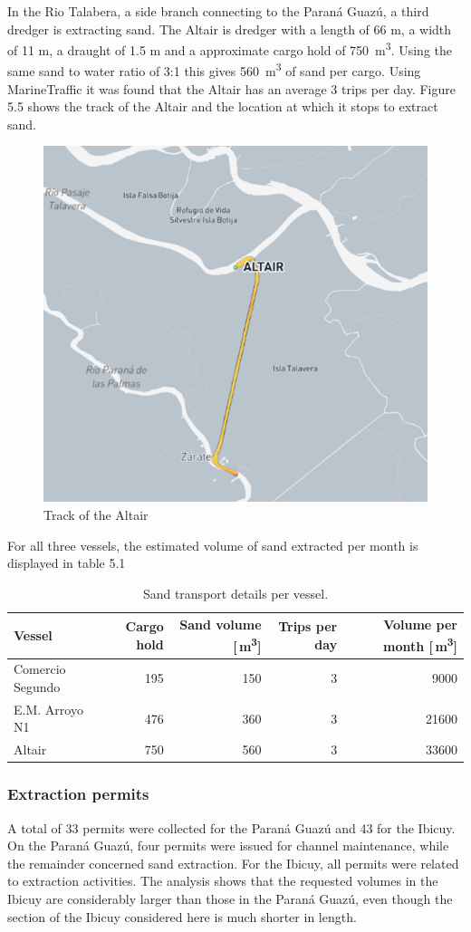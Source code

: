 In the Rio Talabera, a side branch connecting to the Paraná Guazú, a third dredger is extracting sand. The Altair is dredger with a length of 66 m, a width of 11 m, a draught of 1.5 m and a approximate cargo hold of 750 \,m\textsuperscript{3}. Using the same sand to water ratio of 3:1 this gives 560 \,m\textsuperscript{3} of sand per cargo. Using MarineTraffic it was found that the Altair has an average 3 trips per day. Figure 5.5 shows the track of the Altair and the location at which it stops to extract sand. 

\begin{figure}[H]
    \centering
    \includegraphics[width=0.5\linewidth]{figures/ch5/Track_Altair.png}
    \caption{Track of the Altair}
    \label{fig:placeholder}
\end{figure}

For all three vessels, the estimated volume of sand extracted per month is displayed in table 5.1
\begin{table}[h!]
\centering
\begin{tabular}{lrrrr}
\hline
\textbf{Vessel} & \textbf{Cargo hold} & \textbf{Sand volume [\,m\textsuperscript{3}]} & \textbf{Trips per day} & \textbf{Volume per month [\,m\textsuperscript{3}]} \\
\hline
Comercio Segundo & 195 & 150 & 3 & 9000 \\
E.M. Arroyo N1 & 476 & 360 & 3 & 21600 \\
Altair & 750 & 560 & 3 & 33600 \\
\hline
\end{tabular}
\caption{Sand transport details per vessel.}
\label{tab:sand_volume}
\end{table}

\subsubsection{Extraction permits}
A total of 33 permits were collected for the Paraná Guazú and 43 for the Ibicuy. On the Paraná Guazú, four permits were issued for channel maintenance, while the remainder concerned sand extraction. For the Ibicuy, all permits were related to extraction activities. The analysis shows that the requested volumes in the Ibicuy are considerably larger than those in the Paraná Guazú, even though the section of the Ibicuy considered here is much shorter in length.

